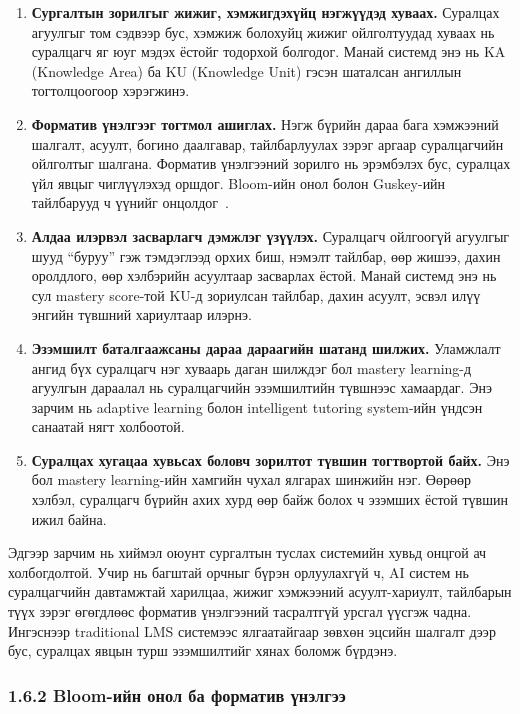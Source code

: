 \documentclass[12pt,A4]{report}
\newcommand{\eng}[1]{#1}
\begin{document}
\begin{enumerate}
    \item \textbf{Сургалтын зорилгыг жижиг, хэмжигдэхүйц нэгжүүдэд хуваах.} Суралцах агуулгыг том сэдвээр бус, хэмжиж болохуйц жижиг ойлголтуудад хуваах нь суралцагч яг юуг мэдэх ёстойг тодорхой болгодог. Манай системд энэ нь KA (\eng{Knowledge Area}) ба KU (\eng{Knowledge Unit}) гэсэн шаталсан ангиллын тогтолцоогоор хэрэгжинэ.

    \item \textbf{Форматив үнэлгээг тогтмол ашиглах.} Нэгж бүрийн дараа бага хэмжээний шалгалт, асуулт, богино даалгавар, тайлбарлуулах зэрэг аргаар суралцагчийн ойлголтыг шалгана. Форматив үнэлгээний зорилго нь эрэмбэлэх бус, суралцах үйл явцыг чиглүүлэхэд оршдог. Bloom-ийн онол болон Guskey-ийн тайлбарууд ч үүнийг онцолдог~\cite{bloom1968,guskey2005,guskey2007}.

    \item \textbf{Алдаа илэрвэл засварлагч дэмжлэг үзүүлэх.} Суралцагч ойлгоогүй агуулгыг шууд ``буруу'' гэж тэмдэглээд орхих биш, нэмэлт тайлбар, өөр жишээ, дахин оролдлого, өөр хэлбэрийн асуултаар засварлах ёстой. Манай системд энэ нь сул mastery score-той KU-д зориулсан тайлбар, дахин асуулт, эсвэл илүү энгийн түвшний хариултаар илэрнэ.

    \item \textbf{Эзэмшилт баталгаажсаны дараа дараагийн шатанд шилжих.} Уламжлалт ангид бүх суралцагч нэг хуваарь даган шилждэг бол mastery learning-д агуулгын дараалал нь суралцагчийн эзэмшилтийн түвшнээс хамаардаг. Энэ зарчим нь adaptive learning болон intelligent tutoring system-ийн үндсэн санаатай нягт холбоотой.

    \item \textbf{Суралцах хугацаа хувьсах боловч зорилтот түвшин тогтвортой байх.} Энэ бол mastery learning-ийн хамгийн чухал ялгарах шинжийн нэг. Өөрөөр хэлбэл, суралцагч бүрийн ахих хурд өөр байж болох ч эзэмших ёстой түвшин ижил байна.
\end{enumerate}

Эдгээр зарчим нь хиймэл оюунт сургалтын туслах системийн хувьд онцгой ач холбогдолтой. Учир нь багштай орчныг бүрэн орлуулахгүй ч, AI систем нь суралцагчийн давтамжтай харилцаа, жижиг хэмжээний асуулт-хариулт, тайлбарын түүх зэрэг өгөгдлөөс форматив үнэлгээний тасралтгүй урсгал үүсгэж чадна. Ингэснээр traditional LMS системээс ялгаатайгаар зөвхөн эцсийн шалгалт дээр бус, суралцах явцын турш эзэмшилтийг хянах боломж бүрдэнэ.

\subsubsection{1.6.2 Bloom-ийн онол ба форматив үнэлгээ}
\end{document}
